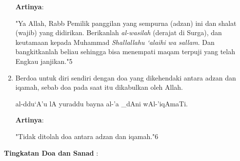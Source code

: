 \documentclass[a4paper,12pt]{article}
\begin{document}
\begin{enumerate}
\begin{arabtext}
\end{arabtext}
\noindent
\textbf{Artinya}:
\par
\indent
"Ya Allah, Rabb Pemilik panggilan yang sempurna (adzan) ini dan shalat 
(wajib) yang didirikan. Berikanlah \textit{al-wasilah} (derajat di Surga), 
dan keutamaan kepada Muhammad \textit{Shallallahu ‘alaihi wa sallam}. Dan 
bangkitkanlah beliau sehingga bisa menempati maqam terpuji yang telah 
Engkau janjikan."{\scriptsize 5}
\item Berdoa untuk diri sendiri dengan doa yang dikehendaki antara adzan 
dan iqamah, sebab doa pada saat itu dikabulkan oleh Allah.
\begin{arabtext}
\noindent
al-ddu`A'u lA yuraddu bayna al-'a _dAni wAl-'iqAmaTi.\\
\end{arabtext}
\noindent
\textbf{Artinya}:
\par
\indent
"Tidak ditolah doa antara adzan dan iqamah."{\scriptsize 6}\\
\end{enumerate}
\par
\noindent
\textbf{Tingkatan Doa dan Sanad} :
\end{document}

